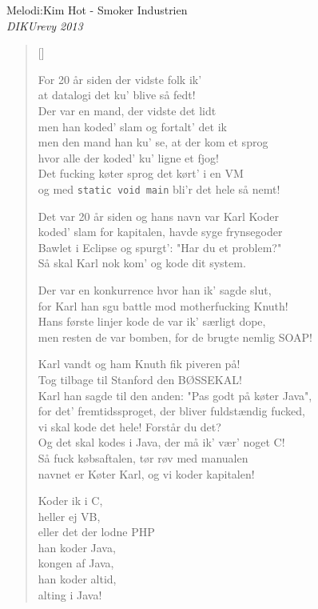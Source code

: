 {Melodi:Kim Hot - Smoker Industrien}\\[.2em]
{\small\itshape DIKUrevy 2013}
\begin{multicols}{2}
\settowidth{\versewidth}{man bli'r tævet med klassestil til man ka' Javaetikette.}
\begin{verse}[\versewidth]

For 20 år siden der vidste folk ik'\\
at datalogi det ku' blive så fedt!\\
Der var en mand, der vidste det lidt\\
men han koded' slam og fortalt' det ik\\
men den mand han ku' se, at der kom et sprog\\
hvor alle der koded' ku' ligne et fjog!\\
Det fucking køter sprog det kørt' i en VM\\
og med \texttt{static void main} bli'r det hele så nemt!

Det var 20 år siden og hans navn var Karl Koder\\
koded' slam for kapitalen, havde syge frynsegoder\\
Bawlet i Eclipse og spurgt': "Har du et problem?"\\
Så skal Karl nok kom' og kode dit system.

Der var en konkurrence hvor han ik' sagde slut,\\
for Karl han sgu battle mod motherfucking Knuth!\\
Hans første linjer kode de var ik' særligt dope,\\
men resten de var bomben, for de brugte nemlig SOAP!

Karl vandt og ham Knuth fik piveren på!\\
Tog tilbage til Stanford den BØSSEKAL!\\
Karl han sagde til den anden: "Pas godt på køter Java",\\
for det' fremtidssproget, der bliver fuldstændig fucked,\\
vi skal kode det hele! Forstår du det?\\
Og det skal kodes i Java, der må ik' vær' noget C!\\
Så fuck købsaftalen, tør røv med manualen\\
navnet er Køter Karl, og vi koder kapitalen!

Koder ik i C,\\
heller ej VB,\\
eller det der lodne PHP\\
han koder Java,\\
kongen af Java,\\
han koder altid,\\
alting i Java!


\end{verse}
\end{multicols}
